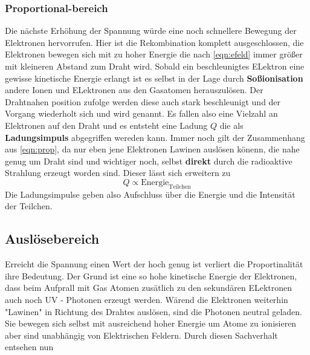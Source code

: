 \subsubsection{Proportional-bereich}
\label{sub:porpotional}
Die nächste Erhöhung der Spannung würde eine noch schnellere Bewegung der Elektronen hervorrufen. Hier ist die Rekombination komplett ausgeschlossen, die Elektronen bewegen sich mit zu hoher Energie die nach \eqref{eqn:efeld} immer größer mit kleineren Abstand zum Draht wird.
Sobald ein beschleunigtes ELektron eine gewisse kinetische Energie erlangt ist es selbst in der Lage durch \textbf{Soßionisation} andere Ionen und ELektronen aus den Gasatomen herauszulösen. Der Drahtnahen position zufolge werden diese auch stark beschleunigt und der Vorgang wiederholt sich
und wird  genannt. Es fallen also eine Vielzahl an Elektronen auf den Draht und es entsteht eine Ladung $Q$ die als \textbf{Ladungsimpuls} abgegriffen wereden kann. 
Immer noch gilt der Zusammenhang aus \eqref{eqn:prop}, da nur eben jene Elektronen Lawinen auslösen könenn, die nahe genug um Draht sind und wichtiger noch, selbst \textbf{direkt} durch die radioaktive Strahlung erzeugt worden sind. Dieser lässt sich erweitern zu
\begin{equation}
\label{eqn:prop}
Q \propto \text{Energie}_\text{Teilchen}
\end{equation}
Die Ladungsimpulse geben also Aufschluss über die Energie und die Intensität der Teilchen. 
\subsection{Auslösebereich}
Erreicht die Spannung einen Wert der hoch genug ist verliert die Proportinalität ihre Bedeutung. 
Der Grund ist eine so hohe kinetische Energie der Elektronen, dass beim Aufprall mit Gas Atomen zusätlich zu den sekundären ELektronen auch noch UV - Photonen erzeugt werden. 
Wärend die Elektronen weiterhin "Lawinen" in Richtung des Drahtes auslösen, sind die Photonen neutral geladen. Sie bewegen sich selbst mit ausreichend hoher Energie um Atome zu ionisieren aber sind unabhängig von 
Elektrischen Feldern. Durch diesen Sachverhalt entsehen nun  
